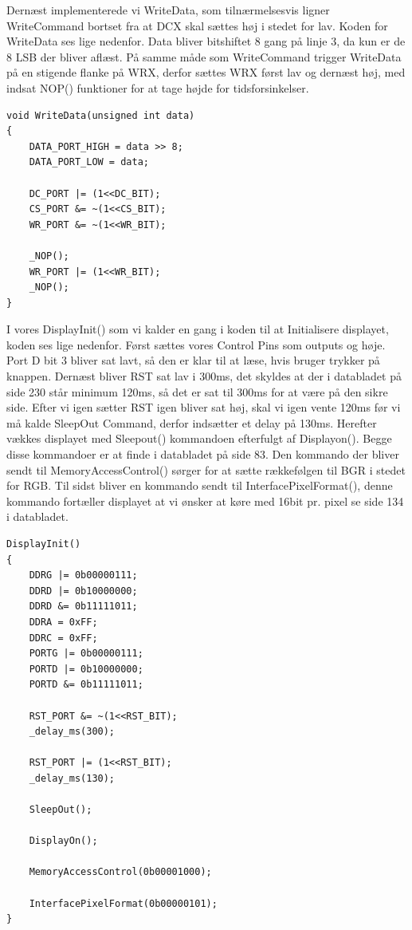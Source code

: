 Dernæst implementerede vi WriteData, som tilnærmelsesvis ligner WriteCommand bortset fra at DCX skal sættes høj i stedet for lav. Koden for WriteData ses lige nedenfor. Data bliver bitshiftet 8 gang på linje 3, da kun er de 8 LSB der bliver aflæst. På samme måde som WriteCommand trigger WriteData på en stigende flanke på WRX, derfor sættes WRX først lav og dernæst høj, med indsat NOP() funktioner for at tage højde for tidsforsinkelser. 

\begin{lstlisting}
void WriteData(unsigned int data)
{
	DATA_PORT_HIGH = data >> 8;
	DATA_PORT_LOW = data;

	DC_PORT |= (1<<DC_BIT);
	CS_PORT &= ~(1<<CS_BIT);
	WR_PORT &= ~(1<<WR_BIT);

	_NOP();
	WR_PORT |= (1<<WR_BIT);
	_NOP();
}
\end{lstlisting}


I vores DisplayInit() som vi kalder en gang i koden til at Initialisere displayet, koden ses lige nedenfor. Først sættes vores Control Pins som outputs og høje. Port D bit 3 bliver sat lavt, så den er klar til at læse, hvis bruger trykker på knappen. Dernæst bliver RST sat lav i 300ms, det skyldes at der i databladet\cite{man:ILI9341} på side 230 står minimum 120ms, så det er sat til 300ms for at være på den sikre side. Efter vi igen sætter RST igen bliver sat høj, skal vi igen vente 120ms før vi må kalde SleepOut Command, derfor indsætter et delay på 130ms. Herefter vækkes displayet med Sleepout() kommandoen efterfulgt af Displayon(). Begge disse kommandoer er at finde i databladet\cite{man:ILI9341} på side 83. Den kommando der bliver sendt til MemoryAccessControl() sørger for at sætte rækkefølgen til BGR i stedet for RGB. Til sidst bliver en kommando sendt til InterfacePixelFormat(), denne kommando fortæller displayet at vi ønsker at køre med 16bit pr. pixel se side 134 i databladet\cite{man:ILI9341}. 


\begin{lstlisting}
DisplayInit()
{
	DDRG |= 0b00000111;
	DDRD |= 0b10000000;
	DDRD &= 0b11111011;
	DDRA = 0xFF;
	DDRC = 0xFF;
	PORTG |= 0b00000111;
	PORTD |= 0b10000000;
	PORTD &= 0b11111011;
	
	RST_PORT &= ~(1<<RST_BIT);
	_delay_ms(300);

	RST_PORT |= (1<<RST_BIT);
	_delay_ms(130);
	
	SleepOut();

	DisplayOn();

	MemoryAccessControl(0b00001000);
	
	InterfacePixelFormat(0b00000101);
}
\end{lstlisting}



